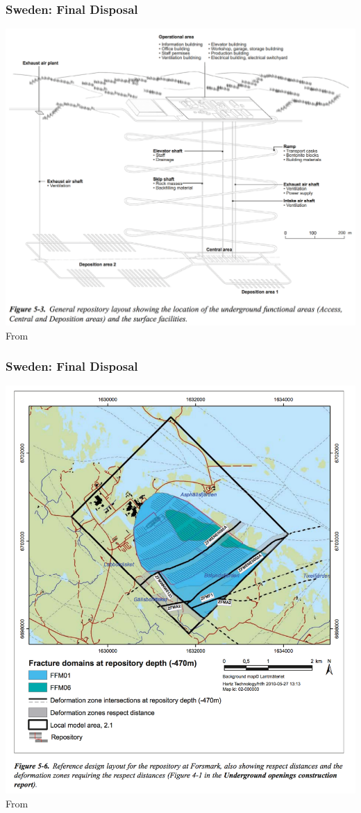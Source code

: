 \begin{frame}[c]
\frametitle{Sweden: Final Disposal}
\includegraphics[height=\textheight]{./images/sweden-forsmark-design}
From \cite{skb_long-term_2011}
\end{frame}

\begin{frame}[c]
\frametitle{Sweden: Final Disposal}
\includegraphics[height=\textheight]{./images/sweden-forsmark-fractures}
From \cite{skb_long-term_2011}
\end{frame}


